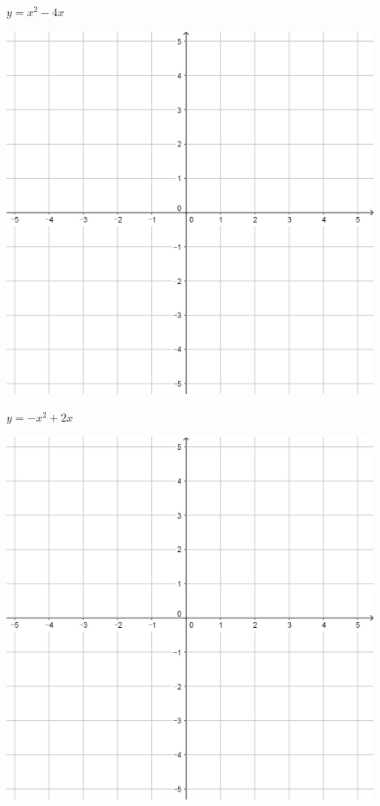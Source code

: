 \documentclass{oblivoir}
\begin{document}
\begin{minipage}{0.45\textwidth}\centering
\(y=x^2-4x\)
\par\bigskip\includegraphics[width=0.9\textwidth]{55}
\end{minipage}
\begin{minipage}{0.45\textwidth}\centering
\(y=-x^2+2x\)
\par\bigskip\includegraphics[width=0.9\textwidth]{55}
\end{minipage}\bigskip\bigskip\par
\end{document}
